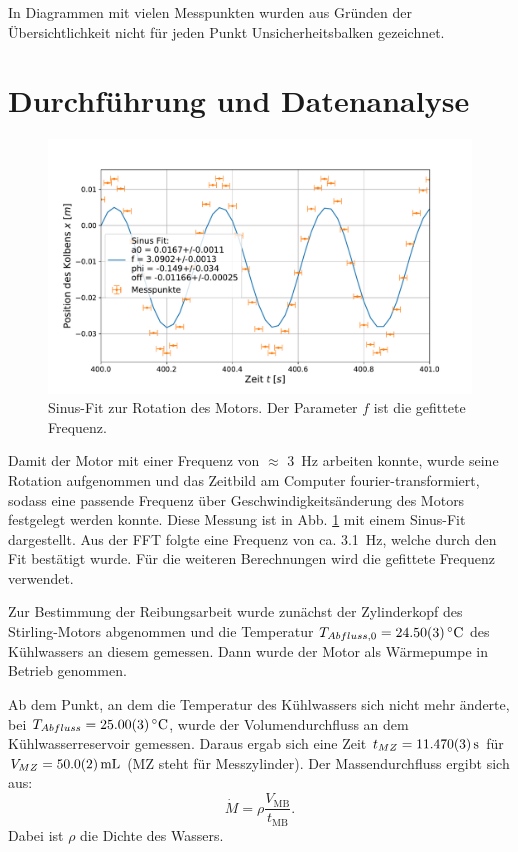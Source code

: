 		In Diagrammen mit vielen Messpunkten wurden aus Gründen der Übersichtlichkeit nicht für jeden Punkt Unsicherheitsbalken gezeichnet.
		
\section{Durchführung und Datenanalyse}	
	\begin{figure}[ht]
		\centering
		\includegraphics[width=\textwidth]{data/Position.pdf}
		\caption{Sinus-Fit zur Rotation des Motors. Der Parameter $f$ ist die gefittete Frequenz.}
		\label{fig:Frequenz}	
	\end{figure}
	Damit der Motor mit einer Frequenz von $\approx$ \SI{3}{\hertz} arbeiten konnte, wurde seine Rotation aufgenommen und das Zeitbild am Computer fourier-transformiert, sodass eine passende Frequenz über Geschwindigkeitsänderung des Motors festgelegt werden konnte.
	Diese Messung ist in Abb. \ref{fig:Frequenz} mit einem Sinus-Fit dargestellt.
	Aus der FFT folgte eine Frequenz von ca. \SI{3,1}{\hertz}, welche durch den Fit bestätigt wurde.
	Für die weiteren Berechnungen wird die gefittete Frequenz verwendet.
	
	Zur Bestimmung der Reibungsarbeit wurde zunächst der Zylinderkopf des Stirling-Motors abgenommen und die Temperatur $T_{Abfluss,0} = \SI{24,5+-0,03}{\celsius}$ des Kühlwassers an diesem gemessen.
	Dann  wurde der Motor als Wärmepumpe in Betrieb genommen.

	Ab dem Punkt, an dem die Temperatur des Kühlwassers sich nicht mehr änderte, bei $T_{Abfluss} = \SI{25,0+-0,03}{\celsius}$, wurde der Volumendurchfluss an dem Kühlwasserreservoir gemessen.
	Daraus ergab sich eine Zeit $t_{MZ} = \SI{11,47+-0,003}{\second}$ für $V_{MZ} = \SI{50+-0,2}{\milli\liter}$ (MZ steht für Messzylinder).	
	Der Massendurchfluss ergibt sich aus:
	\begin{equation} %
		\dot{M} = \rho \frac{V_\text{MB}}{t_\text{MB}}.
	\end{equation} %
	Dabei ist $\rho$ die Dichte des Wassers.
	
